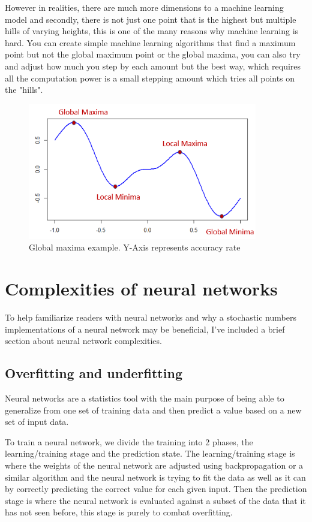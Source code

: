 \documentclass[a4paper,oneside,phd,etd]{BYUPhys}
\begin{document}
However in realities, there are much more dimensions to a machine learning model and secondly, there is not just one point that is the highest but multiple hills of varying heights, this is one of the many reasons why machine learning is hard. You can create simple machine learning algorithms that find a maximum point but not the global maximum point or the global maxima, you can also try and adjust how much you step by each amount but the best way, which requires all the computation power is a small stepping amount which tries all points on the "hills". 
\begin{figure}[H]
\centering
\includegraphics[width=10cm]{pictures/global_minima.png}
\caption{Global maxima example.
Y-Axis represents accuracy rate}
\label{fig:global_minima}
\end{figure}

\section{Complexities of neural networks}
To help familiarize readers with neural networks and why a stochastic numbers implementations of a neural network may be beneficial, I've included a brief section about neural network complexities.

\subsection{Overfitting and underfitting}
Neural networks are a statistics tool with the main purpose of being able to generalize from one set of training data and then predict a value based on a new set of input data. 

To train a neural network, we divide the training into 2 phases, the learning/training stage and the prediction state. The learning/training stage is where the weights of the neural network are adjusted using backpropagation or a similar algorithm and the neural network is trying to fit the data as well as it can by correctly predicting the correct value for each given input. Then the prediction stage is where the neural network is evaluated against a subset of the data that it has not seen before, this stage is purely to combat overfitting\cite{overfitting}.
\end{document}
